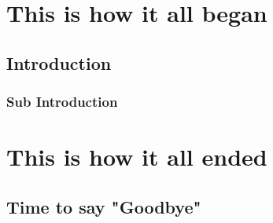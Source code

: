 \documentclass[11pt,fleqn]{book}
\begin{document}
\chapter{This is how it all began}
\section{Introduction}
\lipsum[4]
\subsection{Sub Introduction}
\lipsum[1-10]

\chapter{This is how it all ended}
\section{Time to say "Goodbye"}
\lipsum
\end{document}
